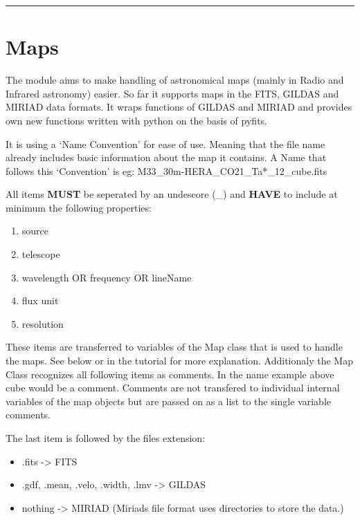 \documentclass[a4paper,10pt,english]{sphinxmanual}
\begin{document}
\bigskip\hrule{}\bigskip



\chapter{Maps}
\label{maps:maps}\label{maps:module-astrolyze.maps}\label{maps::doc}
The  module aims to make handling of astronomical maps (mainly in Radio
and Infrared astronomy) easier. So far it supports maps in the FITS, GILDAS and
MIRIAD data formats. It wraps functions of GILDAS and MIRIAD and provides own
new functions written with python on the basis of pyfits.

It is using a `Name Convention' for ease of use. Meaning that the file name
already includes basic information about the map it contains. A Name that
follows this `Convention' is eg: M33\_30m-HERA\_CO21\_Ta*\_12\_cube.fits

All items \textbf{MUST} be seperated by an undescore (\_) and \textbf{HAVE} to include at
minimum the following properties:
\begin{enumerate}
\item {} 
source

\item {} 
telescope

\item {} 
wavelength OR frequency OR lineName

\item {} 
flux unit

\item {} 
resolution

\end{enumerate}

These items are transferred to variables of the Map class that is used to
handle the maps. See below or in the tutorial for more explanation. 
Additionaly the Map Class recognizes all following items as comments. In the
name example above cube would be a comment. Comments are not transfered to
individual internal variables of the map objects but are passed on as a list to
the single variable comments.

The last item is followed by the files extension:
\begin{itemize}
\item {} 
.fits -\textgreater{} FITS

\item {} 
.gdf, .mean, .velo, .width, .lmv -\textgreater{} GILDAS

\item {} 
nothing -\textgreater{} MIRIAD (Miriads file format uses directories to store the data.)

\end{itemize}
\end{document}
